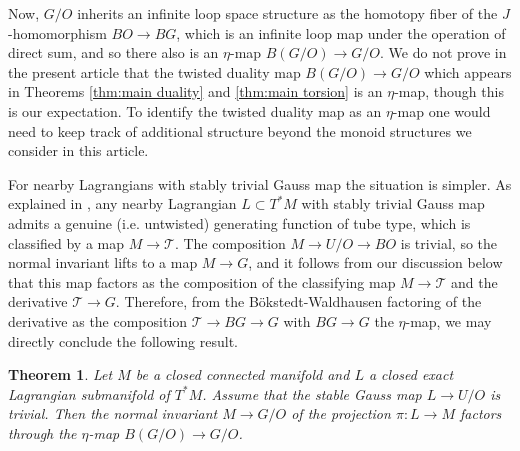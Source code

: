 \documentclass[reqno]{amsart}
\theoremstyle{theorem}
\newtheorem{theorem}{Theorem}
\theoremstyle{remark}
\theoremstyle{definition}
\newcommand{\T}{\mathcal{T}}
\newcommand{\QQ}{\mathcal{Q}}
\begin{document}
Now, $G/O$ inherits an infinite loop space structure as the homotopy fiber of the $J$-homomorphism $BO \to BG$, which is an infinite loop map under the operation of direct sum, and so there also is an $\eta$-map $B(G/O) \to G/O$. We do not prove in the present article that the twisted duality map $B(G/O) \to G/O$ which appears in Theorems \ref{thm:main duality} and \ref{thm:main torsion} is an $\eta$-map, though this is our expectation. To identify the twisted duality map as an $\eta$-map one would need to keep track of additional structure beyond the monoid structures we consider in this article.






For nearby Lagrangians with stably trivial Gauss map the situation is simpler. As explained in \cite{ACGK}, any nearby Lagrangian $L \subset T^*M$ with stably trivial Gauss map admits a genuine (i.e. untwisted) generating function of tube type, which is classified by a map $M \to \T$. The composition $M \to U/O \to BO$ is trivial, so the normal invariant lifts to a map $M \to G$, and it follows from our discussion below that this map factors as the composition of the classifying map $M \to \T$ and the derivative $\T \to G$. Therefore, from the B\"okstedt-Waldhausen factoring of the derivative as the composition $\T \to BG \to G$ with $BG \to G$ the $\eta$-map, we may directly conclude the following result.

\begin{theorem}\label{cor:main eta1}
Let $M$ be a closed connected manifold and $L$ a closed exact Lagrangian submanifold of $T^*M$. Assume that the stable Gauss map $L \to U/O$ is trivial. Then the normal invariant $M \to G/O$ of the projection $\pi: L \to M$ factors through the $\eta$-map $B(G/O) \to G/O$.
\end{theorem}
\end{document}
